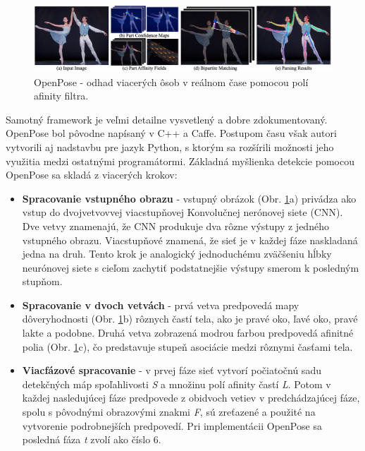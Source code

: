 \documentclass[slovak,master,dept460,male,cpp,cpdeclaration]{diploma}
\begin{document}
\begin{figure}[H]
	\centering
	\includegraphics[width=1\textwidth]{Figures/openposePipeline.png}
	\caption{OpenPose - odhad viacerých ôsob v reálnom čase pomocou polí afinity filtra.\cite{cao2018openpose}}
	\label{fig:openposeOverall}
\end{figure}

 Samotný framework je veľmi detailne vysvetlený a dobre zdokumentovaný. OpenPose bol pôvodne napísaný v C++ a Caffe\cite{jia2014caffe}. Postupom času však  autori vytvorili aj  nadstavbu pre jazyk Python, s ktorým sa rozšírili možnosti jeho využitia medzi ostatnými programátormi. Základná myšlienka detekcie pomocou OpenPose sa skladá z viacerých krokov:

\begin{itemize}
\item \textbf{Spracovanie vstupného obrazu} - vstupný obrázok (Obr. \ref{fig:openposeOverall}a) privádza ako vstup do dvojvetvovvej viacstupňovej Konvolučnej nerónovej siete (CNN). Dve vetvy znamenajú, že CNN produkuje dva rôzne výstupy z jedného vstupného obrazu. Viacstupňové znamená, že sieť je v každej fáze naskladaná jedna na druh. Tento krok je analogický jednoduchému zväčšeniu hĺbky neurónovej siete s cieľom zachytiť podstatnejšie výstupy smerom k posledným stupňom.

\item \textbf{Spracovanie v dvoch vetvách} - prvá vetva predpovedá mapy dôveryhodnosti (Obr. \ref{fig:openposeOverall}b) rôznych častí tela, ako je pravé oko, ľavé oko, pravé lakte a podobne. Druhá vetva zobrazená modrou farbou predpovedá afinitné polia (Obr. \ref{fig:openposeOverall}c), čo predstavuje stupeň asociácie medzi rôznymi časťami tela.

\item \textbf{Viacfázové spracovanie} - v prvej fáze sieť vytvorí počiatočnú sadu detekčných máp spoľahlivosti \textit{S} a množinu polí afinity častí \textit{L}. Potom v každej nasledujúcej fáze predpovede z obidvoch vetiev v predchádzajúcej fáze, spolu s pôvodnými obrazovými znakmi \textit{F}, sú zreťazené a použité na vytvorenie podrobnejších predpovedí. Pri implementácii OpenPose sa posledná fáza \textit{t} zvolí ako číslo 6.
\end{itemize}
\end{document}
